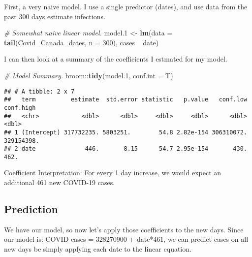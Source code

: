\documentclass[]{tufte-handout}
\newenvironment{Shaded}{}{}
\newcommand{\CommentTok}[1]{\textcolor[rgb]{0.38,0.63,0.69}{\textit{#1}}}
\newcommand{\DataTypeTok}[1]{\textcolor[rgb]{0.56,0.13,0.00}{#1}}
\newcommand{\DecValTok}[1]{\textcolor[rgb]{0.25,0.63,0.44}{#1}}
\newcommand{\FloatTok}[1]{\textcolor[rgb]{0.25,0.63,0.44}{#1}}
\newcommand{\KeywordTok}[1]{\textcolor[rgb]{0.00,0.44,0.13}{\textbf{#1}}}
\newcommand{\NormalTok}[1]{#1}
\newcommand{\OperatorTok}[1]{\textcolor[rgb]{0.40,0.40,0.40}{#1}}
\newcommand{\StringTok}[1]{\textcolor[rgb]{0.25,0.44,0.63}{#1}}
\begin{document}
First, a very naive model. I use a single predictor (dates), and use
data from the past 300 days estimate infections.

\begin{Shaded}
\begin{Highlighting}[]
\CommentTok{# Somewhat naive linear model.}
\NormalTok{model}\FloatTok{.1}\NormalTok{ <-}\StringTok{ }\KeywordTok{lm}\NormalTok{(}\DataTypeTok{data =} \KeywordTok{tail}\NormalTok{(Covid_Canada_dates, }\DataTypeTok{n =} \DecValTok{300}\NormalTok{), cases }\OperatorTok{~}\StringTok{ }\NormalTok{date)}
\end{Highlighting}
\end{Shaded}

I can then look at a summary of the coefficients I estmated for my
model.

\begin{Shaded}
\begin{Highlighting}[]
\CommentTok{# Model Summary.}
\NormalTok{broom}\OperatorTok{::}\KeywordTok{tidy}\NormalTok{(model}\FloatTok{.1}\NormalTok{, }\DataTypeTok{conf.int =}\NormalTok{ T)}
\end{Highlighting}
\end{Shaded}

\begin{verbatim}
## # A tibble: 2 x 7
##   term          estimate  std.error statistic   p.value   conf.low  conf.high
##   <chr>            <dbl>      <dbl>     <dbl>     <dbl>      <dbl>      <dbl>
## 1 (Intercept) 317732235. 5803251.        54.8 2.82e-154 306310072. 329154398.
## 2 date              446.       8.15      54.7 2.95e-154       430.       462.
\end{verbatim}

Coefficient Interpretation: For every 1 day increase, we would expect an
additional 461 new COVID-19 cases.

\hypertarget{prediction}{%
\subsection{Prediction}\label{prediction}}

We have our model, so now let's apply those coefficients to the new
days. Since our model is: COVID cases = 328270900 + date*461, we can
predict cases on all new days be simply applying each date to the linear
equation.

\begin{Shaded}
\end{Shaded}
\end{document}
